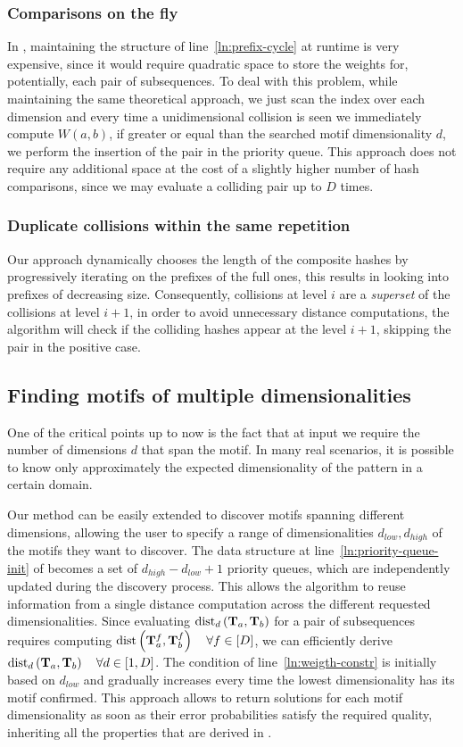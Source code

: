 \subsubsection*{Comparisons on the fly}
In , maintaining the structure of line~\ref{ln:prefix-cycle} at runtime is very expensive, 
since it would require quadratic space to store the weights for, potentially, each pair of subsequences.
To deal with this problem, while maintaining the same theoretical approach, we just scan the index over each dimension and every time a unidimensional collision is seen we immediately compute $W(a,b)$, if greater or equal than the searched motif dimensionality $d$, we perform the insertion of the pair in the priority queue. This approach does not require any additional space at the cost of a slightly higher number of hash comparisons, since we may evaluate a colliding pair up to $D$ times.

\subsubsection*{Duplicate collisions within the same repetition}
Our approach dynamically chooses the length of the composite hashes by progressively iterating on the prefixes of the full ones, this results in looking into prefixes of decreasing size. Consequently, collisions at level $i$ are a \textit{superset} of the collisions at level $i+1$, in order to avoid unnecessary distance computations, the algorithm will check if the colliding hashes appear at the level $i+1$, skipping the pair in the positive case.
\subsection{Finding motifs of multiple dimensionalities}
\label{sec:multisub}
One of the critical points up to now is the fact that at input we require the number of dimensions $d$ that span the motif. In many real scenarios, it is possible to know only approximately the expected dimensionality of the pattern in a certain domain.

Our method can be easily extended to discover motifs spanning different dimensions,
allowing the user to specify a range of dimensionalities $d_{low}, d_{high}$ of the motifs they want to discover.
The data structure at line~\ref{ln:priority-queue-init} of  becomes a set of $d_{high}-d_{low}+1$ priority queues, which are independently updated during the discovery process.
This allows the algorithm to reuse information from a single distance computation across the different requested dimensionalities. Since evaluating $\operatorname{dist}_{d}\left(\mathbf{T}_{a},\mathbf{T}_{b}\right)$ for a pair of subsequences requires computing $\operatorname{dist}\left(\mathbf{T}_{a}^{f},\mathbf{T}_{b}^{f}\right) \quad\forall f\in[D]$, we can efficiently derive $\operatorname{dist}_{d}\left(\mathbf{T}_{a},\mathbf{T}_{b}\right) \quad \forall d\in[1,D]$.
The condition of line~\ref{ln:weigth-constr} is initially based on $d_{low}$ and gradually increases every time the lowest dimensionality has its motif confirmed.
This approach allows to return solutions for each motif dimensionality as soon as their error probabilities satisfy the required quality, inheriting all the properties that are derived in .
